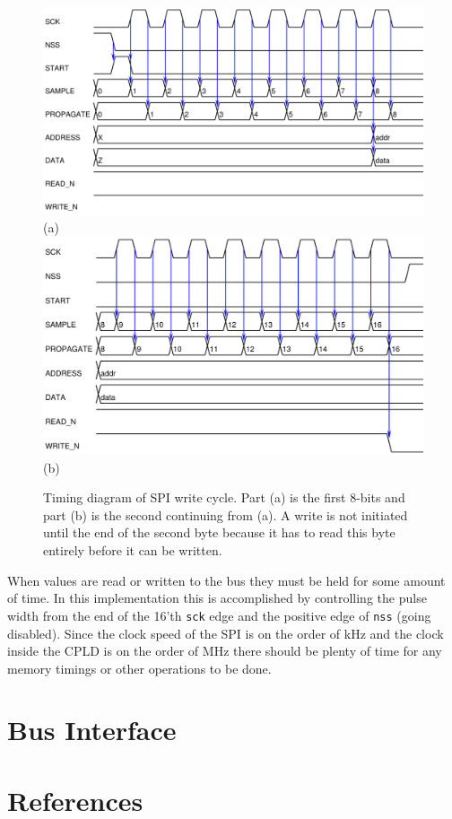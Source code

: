 \documentclass{article}
\begin{document}
\begin{figure}
\center
\includegraphics[scale=0.7]{figure/spi_ctl-timing/write-byte1} \\
(a) \\
\includegraphics[scale=0.7]{figure/spi_ctl-timing/write-byte2} \\
(b)
\caption{Timing diagram of SPI write cycle.
Part (a) is the first 8-bits and part (b) is the second
continuing from (a).
A write is not initiated until the end of the
second byte because it has to read this byte entirely before it can be written.}
\label{fig:spi_write}
\end{figure}

When values are read or written to the bus they must be held for
some amount of time.
In this implementation this is accomplished by controlling the
pulse width from the end of the 16'th \verb+sck+ edge and the positive
edge of \verb+nss+ (going disabled).
Since the clock speed of the SPI is on the order of kHz and the
clock inside the CPLD is on the order of MHz there should be plenty
of time for any memory timings or other operations to be done.


\section{Bus Interface}


\clearpage

\pagebreak
\renewcommand*{\refname}{\vspace{-8mm}}
\section{References}
%


\end{document}
